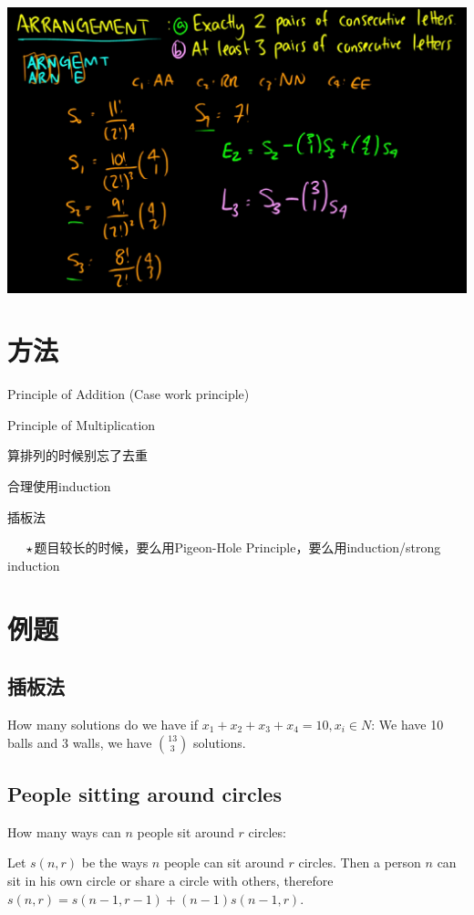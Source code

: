 \documentclass[12pt,a4paper]{ctexrep}
\begin{document}
\begin{center}
\includegraphics[scale=0.3]{PIE_Example.png}
\end{center}

\section{方法}
Principle of Addition (Case work principle)

Principle of Multiplication

算排列的时候别忘了去重

合理使用induction

插板法

$\indent\star$题目较长的时候，要么用Pigeon-Hole Principle，要么用induction/strong induction

\section{例题}
\subsection{插板法}
How many solutions do we have if $x_1+x_2+x_3+x_4 = 10, x_i \in N$: We have 10 balls and 3 walls, we have $\binom{13}{3}$ solutions.

\subsection{People sitting around circles}
How many ways can $n$ people sit around $r$ circles: 

Let $s(n,r)$ be the ways $n$ people can sit around $r$ circles. Then a person $n$ can sit in his own circle or share a circle with others, therefore $s(n,r) = s(n-1,r-1)+(n-1)s(n-1,r)$.
\end{document}
